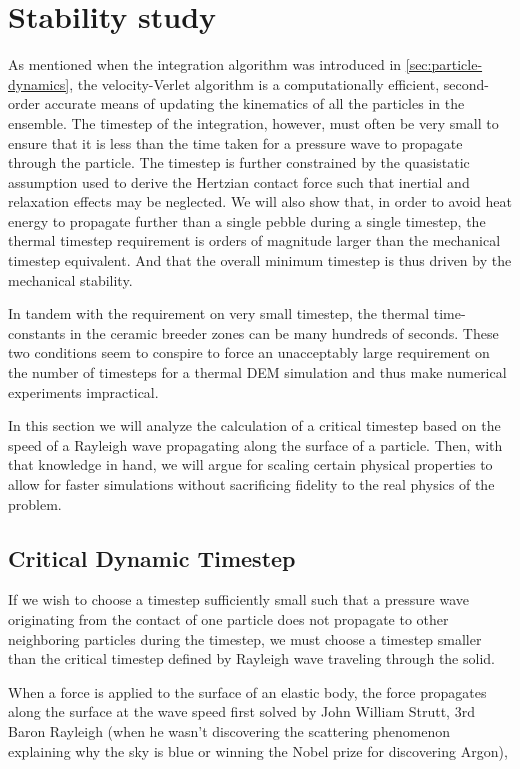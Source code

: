 \section{Stability study}\label{sec:dem-stability}
As mentioned when the integration algorithm was introduced in \cref{sec:particle-dynamics}, the velocity-Verlet algorithm is a computationally efficient, second-order accurate means of updating the kinematics of all the particles in the ensemble\cite{Kruggel-Emden2008}. The timestep of the integration, however, must often be very small to ensure that it is less than the time taken for a pressure wave to propagate through the particle. The timestep is further constrained by the quasistatic assumption used to derive the Hertzian contact force such that inertial and relaxation effects may be neglected\cite{Brilliantov1996}. We will also show that, in order to avoid heat energy to propagate further than a single pebble during a single timestep, the thermal timestep requirement is orders of magnitude larger than the mechanical timestep equivalent. And that the overall minimum timestep is thus driven by the mechanical stability.

In tandem with the requirement on very small timestep, the thermal time-constants in the ceramic breeder zones can be many hundreds of seconds. These two conditions seem to conspire to force an unacceptably large requirement on the number of timesteps for a thermal DEM simulation and thus make numerical experiments impractical.

In this section we will analyze the calculation of a critical timestep based on the speed of a Rayleigh wave propagating along the surface of a particle. Then, with that knowledge in hand, we will argue for scaling certain physical properties to allow for faster simulations without sacrificing fidelity to the real physics of the problem.


\subsection{Critical Dynamic Timestep}
If we wish to choose a timestep sufficiently small such that a pressure wave originating from the contact of one particle does not propagate to other neighboring particles during the timestep, we must choose a timestep smaller than the critical timestep defined by Rayleigh wave traveling through the solid.

When a force is applied to the surface of an elastic body, the force propagates along the surface at the wave speed first solved by John William Strutt, 3rd Baron Rayleigh\cite{Rayleigh1885} (when he wasn't discovering the scattering phenomenon explaining why the sky is blue or winning the Nobel prize for discovering Argon),

